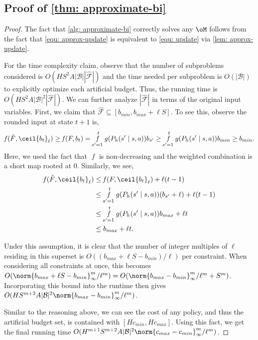 \documentclass[pdftex, a4paper, 12pt]{article}
\newcommand{\round}[2]{\ceil{#2}_{#1}}
\newcommand{\mB}{\mathcal{B}}
\newcommand{\cmin}{c_{min}}
\newcommand{\cmax}{c_{max}}
\newcommand{\bmax}{b_{max}}
\newcommand{\bmin}{b_{min}}
\newcommand{\hF}{\hat{F}}
\newcommand{\hmF}{\hat{\mathcal{F}}}
\DeclareMathOperator*{\f}{\mathit{f}}
\begin{document}
\subsection{Proof of \texorpdfstring{\cref{thm: approximate-bi}}{thm: approximate-bi}}

\begin{proof}
    The fact that \cref{alg: approximate-bi} correctly solves any $\oM$ follows from the fact that \eqref{equ: approx-update} is equivalent to \eqref{equ: update} via \cref{lem: approx-update}.

    For the time complexity claim, observe that the number of subproblems considered is $O(HS^2A|\mB||\hmF|)$ and the time needed per subproblem is $O(|\mB|)$ to explicitly optimize each artificial budget. Thus, the running time is $O(HS^2A|\mB|^2|\hmF|)$. We can further analyze $|\hmF|$ in terms of the original input variables. First, we claim that $\hmF \subseteq [\bmin, \bmax + \ell S]$. To see this, observe the rounded input at state $t+1$ is,
    \begin{equation*}
        \f(\hF, \round{\ell}{b_t}) \geq \f(F, b_t) = \f_{s' = 1}^t g(P_h(s' \mid s,a))b_{s'} \geq \f_{s' = 1}^t g(P_h(s' \mid s,a))\bmin \geq \bmin.
    \end{equation*}
    Here, we used the fact that $\f$ is non-decreasing and the weighted combination is a short map rooted at $0$. Similarly, we see,
    \begin{align*}
        \f(\hF, \round{\ell}{b_t}) &\leq \f(F, \round{\ell}{b_t}) + \ell (t-1) \\
        &\leq \f_{s' = 1}^t g(P_h(s' \mid s,a))(b_{s'}+\ell) + \ell (t-1)\\
        &\leq \f_{s' = 1}^t g(P_h(s' \mid s,a))\bmax + \ell t\\
        &\leq \bmax + \ell t.
    \end{align*}
    
    Under this assumption, it is clear that the number of integer multiples of $\ell$ residing in this superset is $O((\bmax + \ell S - \bmin)/\ell)$ per constraint. When considering all constraints at once, this becomes $O(\norm{\bmax + \ell S - \bmin}_{\infty}^m/\ell^m) = O(\norm{\bmax - \bmin}_{\infty}^m/\ell^m + S^m)$. Incorporating this bound into the runtime then gives $O(HS^{m + 2}A|\mB|^2\norm{\bmax - \bmin}_{\infty}^m/\ell^m)$. 

    Similar to the reasoning above, we can see the cost of any policy, and thus the artificial budget set, is contained with $[H\cmin, H\cmax]$.
    Using this fact, we get the final running time $O(H^{m + 1}S^{m+2}A|\mB|^2\norm{\cmax - \cmin}_{\infty}^m/\ell^m)$.

    
\end{proof}
\end{document}
